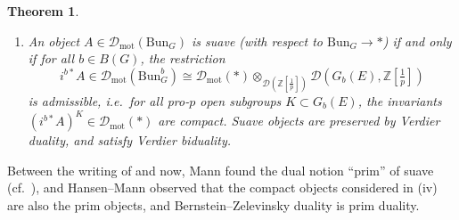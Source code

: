 \documentclass[11pt]{amsart}
\numberwithin{equation}{section}
\newtheorem{theorem}{Theorem}
\numberwithin{theorem}{section}
\theoremstyle{definition}
\newcommand{\Bun}{\mathrm{Bun}}
\begin{document}
\begin{theorem}
\begin{enumerate}
\item[{\rm (v)}] An object $A\in \mathcal D_{\mathrm{mot}}(\Bun_G)$ is suave (with respect to $\Bun_G\to \ast$) if and only if for all $b\in B(G)$, the restriction
\[
i^{b\ast} A\in \mathcal D_{\mathrm{mot}}(\Bun_G^b)\cong \mathcal D_{\mathrm{mot}}(\ast)\otimes_{\mathcal D(\mathbb Z[\tfrac 1p])} \mathcal D(G_b(E),\mathbb Z[\tfrac 1p])
\]
is admissible, i.e.~for all pro-$p$ open subgroups $K\subset G_b(E)$, the invariants $(i^{b\ast} A)^K\in \mathcal D_{\mathrm{mot}}(\ast)$ are compact. Suave objects are preserved by Verdier duality, and satisfy Verdier biduality.
\end{enumerate}
\end{theorem}

Between the writing of \cite{FarguesScholze} and now, Mann found the dual notion ``prim'' of suave (cf.~\cite[Definition 4.4.1]{HeyerMann}), and Hansen--Mann observed that the compact objects considered in (iv) are also the prim objects, and Bernstein--Zelevinsky duality is prim duality.
\end{document}
